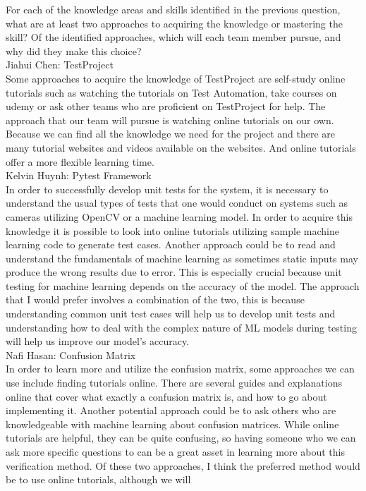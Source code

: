 \documentclass[12pt]{article}
\begin{document}
\begin{outline}[enumerate]
  \1 For each of the knowledge areas and skills identified in the previous question, what are at least two approaches to acquiring the knowledge or
  mastering the skill? Of the identified approaches, which will each team member pursue, and why did they make this choice?\\
    \2 Jiahui Chen: TestProject\\
    Some approaches to acquire the knowledge of TestProject are self-study online tutorials such as watching the tutorials on Test Automation, take courses on udemy or ask 
    other teams who are proficient on TestProject for help. The approach that our team will pursue is watching online tutorials on our own. Because we can find all the 
    knowledge we need for the project and there are many tutorial websites and videos available on the websites. And online tutorials offer a more flexible learning time.\\
    \2 Kelvin Huynh: Pytest Framework\\
    In order to successfully develop unit tests for the system, it is necessary to understand the usual types of tests that one would conduct on systems such as cameras 
    utilizing OpenCV or a machine learning model. In order to acquire this knowledge it is possible to look into online tutorials utilizing sample machine learning code to 
    generate test cases. Another approach could be to read and understand the fundamentals of machine learning as sometimes static inputs may produce the wrong results due 
    to error. This is especially crucial because unit testing for machine learning depends on the accuracy of the model. The approach that I would prefer involves a combination 
    of the two, this is because understanding common unit test cases will help us to develop unit tests and understanding how to deal with the complex nature of ML models 
    during testing will help us improve our model’s accuracy.\\
    \2 Nafi Hasan: Confusion Matrix\\
    In order to learn more and utilize the confusion matrix, some approaches we can use include finding tutorials online. There are several guides and explanations online
    that cover what exactly a confusion matrix is, and how to go about implementing it. Another potential approach could be to ask others who are knowledgeable with machine 
    learning about confusion matrices. While online tutorials are helpful, they can be quite confusing, so having someone who we can ask more specific questions to can be a 
    great asset in learning more about this verification method. Of these two approaches, I think the preferred method would be to use online tutorials, although we will 

\end{outline}
\end{document}
